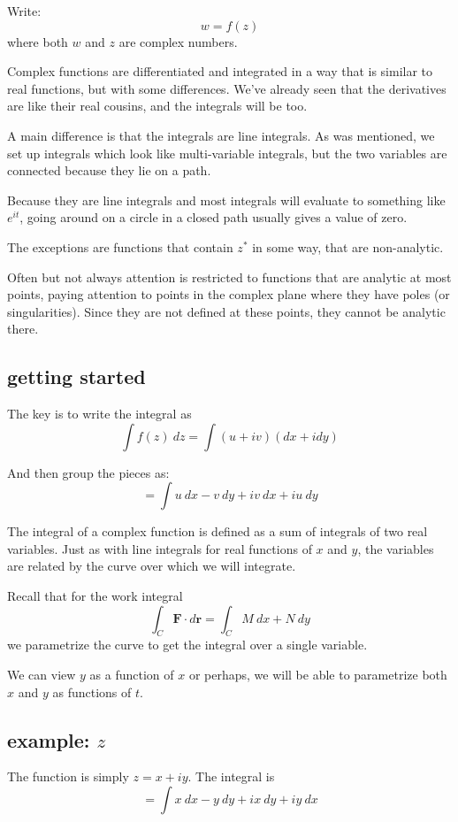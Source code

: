 \documentclass[11pt, oneside]{article}
\begin{document}
Write:
\[ w = f(z) \]
where both $w$ and $z$ are complex numbers.

Complex functions are differentiated and integrated in a way that is similar to real functions, but with some differences.  We've already seen that the derivatives are like their real cousins, and the integrals will be too.

A main difference is that the integrals are line integrals.  As was mentioned, we set up integrals which look like multi-variable integrals, but the two variables are connected because they lie on a path.  

Because they are line integrals and most integrals will evaluate to something like $e^{it}$, going around on a circle in a closed path usually gives a value of zero.

The exceptions are functions that contain $z^*$ in some way, that are non-analytic.

Often but not always attention is restricted to functions that are analytic at most points, paying attention to points in the complex plane where they have poles (or singularities).  Since they are not defined at these points, they cannot be analytic there.

\subsection*{getting started}

The key is to write the integral as
 \[ \int f(z) \ dz = \int (u + i v) (dx + i dy) \]
 
And then group the pieces as:
\[ = \int u \ dx - v \ dy + iv \ dx + iu \ dy \]

The integral of a complex function is defined as a sum of integrals of two real variables.  Just as with line integrals for real functions of $x$ and $y$, the variables are related by the curve over which we will integrate.

Recall that for the work integral
\[ \int_C \mathbf{F} \cdot d \mathbf{r} = \int_C M \ dx + N \ dy \]
we parametrize the curve to get the integral over a single variable.

We can view $y$ as a function of $x$ or perhaps, we will be able to parametrize both $x$ and $y$ as functions of $t$.

\subsection*{example: $z$}

The function is simply $z = x + iy$.  The integral is 
\[ = \int x \ dx - y \ dy + i x \ dy + i y \ dx \]
\end{document}
